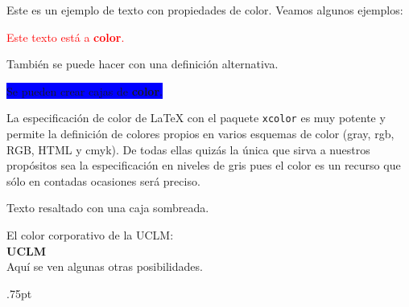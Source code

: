 \documentclass[11pt,a4paper]{article}
\begin{document}
Este es un ejemplo de texto con propiedades de color. Veamos algunos ejemplos:

\textcolor{red}{Este texto está a \textbf{color}.}

También se puede hacer {\color{green} con una definición alternativa.}

\colorbox{blue}{Se pueden crear cajas de {\color{yellow}\textbf{color}}.}

La especificación de color de \LaTeX{} con el paquete \texttt{xcolor} es muy potente y permite la definición de colores propios en varios esquemas de color (gray, rgb, RGB, HTML y cmyk). De todas ellas quizás la única que sirva a nuestros propósitos sea la especificación en niveles de gris pues el color es un recurso que sólo en contadas ocasiones será preciso.

\colorbox{sombra}{Texto resaltado con una caja sombreada.}

\setlength{\fboxrule}{4pt}

\setlength{\fboxrule}{0.5pt} %
\begin{center}
\end{center}

\noindent El color corporativo de la UCLM:\\

\colorbox{UCLMred}{\Huge \color{white}\textsf{\textbf{UCLM}}}\\


\noindent Aquí se ven algunas otras posibilidades.

\newcount\WL \unitlength.75pt
\end{document}
